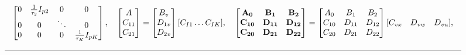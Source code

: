 \documentclass[twocolumn]{autart}    %
\begin{document}
\begin{figure*}[ht]
\begin{equation}
\begin{aligned}
\begin{bmatrix}
            0 & \frac{1}{\tau_{2}}I_{p2} & 0 & 0          \\
            0 & 0 &\ddots & 0  \\ 
            0 & 0 & 0 & \frac{1}{\tau_{K}}I_{pK}
            \end{bmatrix},    \quad \begin{bmatrix}
                                                        A \\
                                                        C_{11} \\
                                                        C_{21} 
                                                    \end{bmatrix}= 
                                                    \begin{bmatrix}
                                                        B_{v} \\
                                                        D_{1v} \\
                                                        D_{2v} 
                                                    \end{bmatrix}[C_{I1} \dots C_{IK}],   \quad\begin{bmatrix}
                                                        \bold{A_{0}} & \bold{B_{1}} & \bold{B_{2}} \\
                                                        \bold{C_{10}} & \bold{D_{11}} & \bold{D_{12}} \\
                                                        \bold{C_{20}} & \bold{D_{21}} & \bold{D_{22}} 
                                                    \end{bmatrix} = 
                                                    \begin{bmatrix}
                                                        A_{0} & B_{1} & B_{2} \\
                                                        C_{10} & D_{11} & D_{12} \\
                                                        C_{20} & D_{21} & D_{22}
                                                    \end{bmatrix}[C_{vx} \quad D_{vw} \quad D_{vu}],\\
\end{aligned}
    \end{equation}
    \vspace{1.5em}
{\noindent}	 \rule[-10pt]{17.5cm}{0.05em}\\
\end{figure*}
\end{document}
